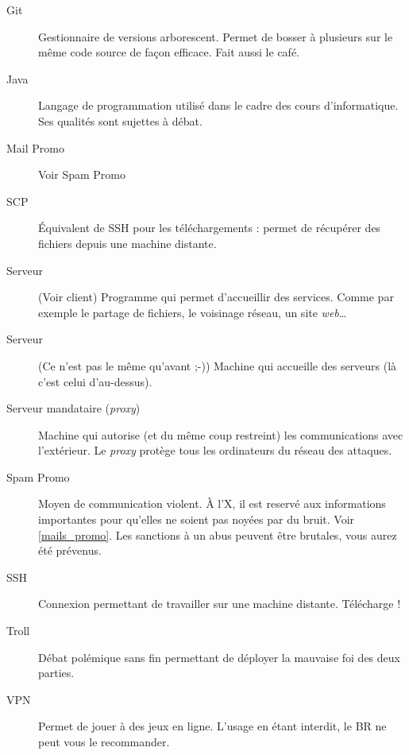 \begin{description}
  \item[Git] Gestionnaire de versions arborescent. Permet de bosser à plusieurs sur le même code source de façon efficace. Fait aussi le café.
  

  
   \item[Java] Langage de programmation utilisé dans le cadre des cours d'informatique. Ses qualités sont sujettes à débat.
   
   \item[Mail Promo] Voir Spam Promo
   
  \item[SCP] Équivalent de SSH pour les téléchargements : permet de récupérer des fichiers depuis une machine distante.
  
  \item[Serveur] (Voir client) Programme qui permet d'accueillir des services. Comme par exemple le partage de fichiers, le voisinage réseau, un site \emph{web}\ldots\
  \item[Serveur] (Ce n'est pas le même qu'avant ;-)) Machine qui accueille des serveurs (là c'est celui d'au-dessus).
  
  \item[Serveur mandataire (\emph{proxy})] Machine qui autorise
(et du même coup restreint) les communications avec l'extérieur. Le \emph{proxy} protège tous les ordinateurs du réseau des attaques.

  \item[Spam Promo] Moyen de communication violent. À l'X, il est reservé aux informations importantes pour qu'elles ne soient pas noyées par du bruit. Voir \ref{mails_promo}. Les sanctions à un abus peuvent être brutales, vous aurez été prévenus.
  \item[SSH] Connexion permettant de travailler sur une machine distante. Télécharge \app{PuTTY} !
  
  \item[Troll] Débat polémique sans fin permettant de déployer la mauvaise foi des deux parties.
  \item[VPN] Permet de jouer à des jeux en ligne. L'usage en étant interdit, le BR ne peut vous le recommander.
  

\end{description}
